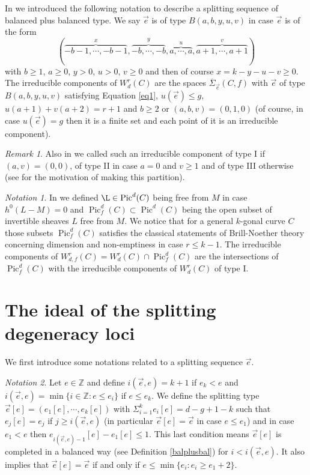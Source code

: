 \documentclass{article}
\DeclareMathOperator{\Pic}{Pic}
\theoremstyle{definition}
\theoremstyle{remark}
\newtheorem{notation}{Notation}
\newtheorem{remark}{Remark}
\begin{document}
In \cite{ref2} we introduced the following notation to describe a splitting sequence of balanced plus balanced type.
We say $\overrightarrow {e}$ is of type $B(a,b,y,u,v)$ in case $\overrightarrow {e}$ is of the form
\[
(\overbrace{-b-1, \cdots , -b-1} ^x, \overbrace{-b, \cdots, -b}^y, \overbrace {a, \cdots, a}^u, \overbrace {a+1, \cdots , a+1}^v)
\]
with $b \geq 1$, $a \geq 0$, $y>0$, $u>0$, $v \geq 0$ and then of course $x=k-y-u-v \geq 0$.
The irreducible components of $W^r_d(C)$ are the spaces $\overline {\Sigma}_{\overrightarrow {e}}(C,f)$ with $\overrightarrow {e}$ of type $B(a,b,y,u,v)$ satisfying Equation \ref{eq1}, $u(\overrightarrow {e})\leq g$, $u(a+1)+v(a+2)=r+1$ and $b \geq 2$ or $(a,b,v)=(0,1,0)$ (of course, in case $u(\overrightarrow {e})=g$ then it is a finite set and each point of it is an irreducible component).

\begin{remark}\label{types}
Also  in \cite {ref2} we called such an irreducible component of type I if $(a,v)=(0,0)$, of type II in case $a=0$ and $v \geq 1$ and of type III otherwise (see \cite{ref2} for the motivation of making this partition).
\end{remark}

\begin{notation}\label{notfree}
In \cite{ref2} we defined $\L \in \Pic^d(C)$ being free from $M$ in case $h^0(L-M)=0$ and $\Pic^d_f(C) \subset \Pic^d(C)$ 
being the open subset of invertible sheaves $L$ free from $M$.
We notice that  for a general $k$-gonal curve $C$ those subsets $\Pic^d_f(C)$ satisfies the classical statements of Brill-Noether theory concerning dimension and non-emptiness in case $r \leq k-1$.
The irreducible components of $W^r_{d,f}(C)=W^r_d(C) \cap \Pic^d_f(C)$ are the intersections of $\Pic^d_f(C)$ with the irreducible components of $W^r_d(C)$ of type I.
\end{notation}



\section{The ideal of the splitting degeneracy loci}\label{section2}
We first introduce some notations related to a splitting sequence $\overrightarrow{e}$.

\begin{notation}\label{not2.1}
Let $e \in \mathbb{Z}$ and define $i(\overrightarrow {e},e)=k+1$ if $e_k <e$ and $i(\overrightarrow{e},e)= \min \{ i\in \mathbb{Z} : e \leq e_i\}$ if $e\leq e_k$.
We define the splitting type $\overrightarrow{e}[e] = (e_1[e], \cdots ,e_k[e])$ with $\Sigma_{i=1}^k e_i[e]=d-g+1-k$ such that $e_j[e]=e_j$ if $j \geq i(\overrightarrow{e},e)$ (in particular $\overrightarrow{e}[e]=\overrightarrow {e}$ in case $e \leq e_1$) and in case $e_1 <e$ then $e_{i(\overrightarrow{e},e)-1}[e]-e_1[e] \leq 1$.
This last condition means $\overrightarrow{e} [e]$ is completed in a balanced way (see Definition \ref{balplusbal}) for $i< i(\overrightarrow{e},e)$.
It also implies that $\overrightarrow {e} [e]=\overrightarrow {e}$ if and only if $e \leq \min \{e_i : e_i \geq e_1+2 \}$.
\end{notation}
\end{document}
